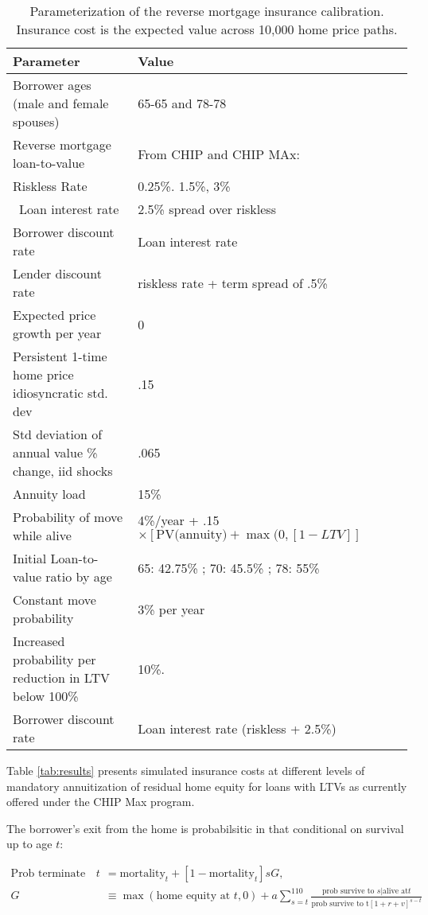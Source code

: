 \documentclass[12pt]{article}
\begin{document}
\begin{landscape}

	\begin{table}
		\caption{\label{tab:parameters} Parameterization of the reverse mortgage insurance calibration. Insurance cost is the expected value across 10,000 home price paths.}
		\begin{tabular}{llll}
			\hline
			Parameter & Value\\
			\hline\hline
			Borrower ages (male and female spouses) & 65-65 and 78-78\\
			Reverse mortgage loan-to-value & From CHIP and CHIP MAx: \\
			Riskless Rate & 0.25\%. 1.5\%, 3\%\\\
			Loan interest rate & 2.5\% spread over riskless \\
			Borrower discount rate & Loan interest rate\\
			Lender discount rate & riskless rate + term spread of .5\%\\
			Expected price growth per year & 0\\
			Persistent 1-time home price idiosyncratic std. dev & .15\\
			Std deviation of annual value \% change, iid shocks & .065\\
			Annuity load & 15\%\\
			Probability of move while alive & 4\%/year + .15$\times \left[\text{PV(annuity)}+\max(0,\left[1-LTV\right]\right]$\\
			Initial Loan-to-value ratio by age & 65: 42.75\% ; 70: 45.5\% ; 78: 55\%\\
			Constant move probability & 3\% per year\\
			Increased probability per reduction in LTV below 100\% & 10\%.\\
			Borrower discount rate & Loan interest rate (riskless + 2.5\%)\\
			\hline
		\end{tabular}
	\end{table}
\end{landscape}

Table \ref{tab:results} presents simulated insurance costs at different levels of mandatory annuitization of residual home equity for loans with LTVs as currently offered under the CHIP Max program. 

The borrower's exit from the home is probabilsitic in that conditional on survival up to age $t$:

\begin{align}
	\text{Prob terminate at  }t & = \text{mortality}_{t} + \left[1-\text{mortality}_{t}\right]sG,\\
	G & \equiv \max\left(\text{home equity at }t,0\right) + a\sum_{s=t}^{110}\frac{\text{prob survive to }s | \text{alive at} t}{\text{prob survive to t} \left[1+r+v\right]^{s-t}}
\end{align}
\end{document}
